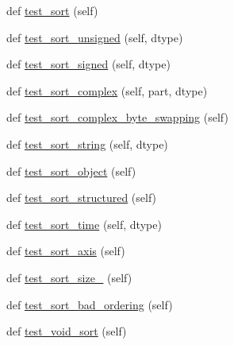 \begin{DoxyCompactItemize}
\item 
def \hyperlink{classnumpy_1_1core_1_1tests_1_1test__multiarray_1_1TestMethods_a5065f25ce59a7a6feeee81e280cfff28}{test\+\_\+sort} (self)
\item 
def \hyperlink{classnumpy_1_1core_1_1tests_1_1test__multiarray_1_1TestMethods_a2bb209d0cca0c9d5d0a3a39877d80a46}{test\+\_\+sort\+\_\+unsigned} (self, dtype)
\item 
def \hyperlink{classnumpy_1_1core_1_1tests_1_1test__multiarray_1_1TestMethods_a93e38af4193e723fe2cae3641d6c1fd4}{test\+\_\+sort\+\_\+signed} (self, dtype)
\item 
def \hyperlink{classnumpy_1_1core_1_1tests_1_1test__multiarray_1_1TestMethods_adc69c9f35d1ef80a3c0dbe32d095b207}{test\+\_\+sort\+\_\+complex} (self, part, dtype)
\item 
def \hyperlink{classnumpy_1_1core_1_1tests_1_1test__multiarray_1_1TestMethods_a8929fb77b8275aae3aaff396936a302b}{test\+\_\+sort\+\_\+complex\+\_\+byte\+\_\+swapping} (self)
\item 
def \hyperlink{classnumpy_1_1core_1_1tests_1_1test__multiarray_1_1TestMethods_a2b264e40ae1f574b7517c6b9da8187f7}{test\+\_\+sort\+\_\+string} (self, dtype)
\item 
def \hyperlink{classnumpy_1_1core_1_1tests_1_1test__multiarray_1_1TestMethods_a672eb0a0a9c583647f237a78623c095e}{test\+\_\+sort\+\_\+object} (self)
\item 
def \hyperlink{classnumpy_1_1core_1_1tests_1_1test__multiarray_1_1TestMethods_a8b05d37620b7ae5e6ad457cace441336}{test\+\_\+sort\+\_\+structured} (self)
\item 
def \hyperlink{classnumpy_1_1core_1_1tests_1_1test__multiarray_1_1TestMethods_a94608d9d657cf68e329007cad53f7648}{test\+\_\+sort\+\_\+time} (self, dtype)
\item 
def \hyperlink{classnumpy_1_1core_1_1tests_1_1test__multiarray_1_1TestMethods_af156672739583ea5e88d4fd8d5b5eea9}{test\+\_\+sort\+\_\+axis} (self)
\item 
def \hyperlink{classnumpy_1_1core_1_1tests_1_1test__multiarray_1_1TestMethods_aa40b2510aad74ce7f8490126de2b56a1}{test\+\_\+sort\+\_\+size\+\_} (self)
\item 
def \hyperlink{classnumpy_1_1core_1_1tests_1_1test__multiarray_1_1TestMethods_a0c4212cca38ec38189a2fe8aa939142f}{test\+\_\+sort\+\_\+bad\+\_\+ordering} (self)
\item 
def \hyperlink{classnumpy_1_1core_1_1tests_1_1test__multiarray_1_1TestMethods_aa75dec87670c297d51b947b7b549cd5c}{test\+\_\+void\+\_\+sort} (self)

\end{DoxyCompactItemize}
